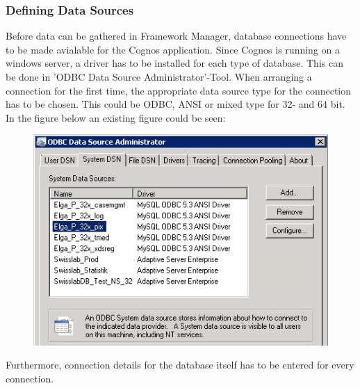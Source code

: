 \documentclass[a4paper]{article}
\begin{document}
	\subsubsection{Defining Data Sources}
	Before data can be gathered in Framework Manager, database connections have to be made avialable
	for the Cognos application. Since Cognos is running on a windows server, a driver has to be installed for each type
	of database. This can be done in 'ODBC Data Source Administrator'-Tool. When arranging a connection for the first time,
	the appropriate data source type for the connection has to be chosen. This could be ODBC, ANSI or mixed type for 32- and 64 bit. In
	the figure below an existing figure could be seen:\\
	\begin{figure}[!ht]
		  \centering
		      \includegraphics[width=1.0\textwidth]{ExistingDataSource}
		  \caption{}
	\end{figure}
	Furthermore, connection details for the database itself has to be entered for every connection.
\end{document}

